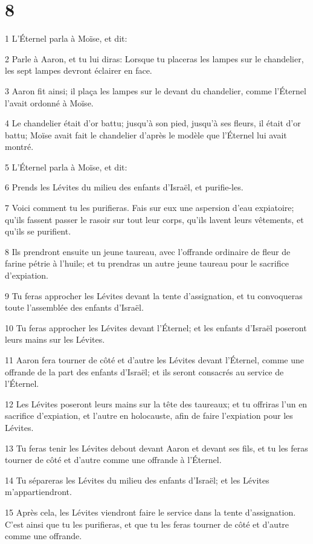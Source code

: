 \chapter{8}

\par 1 L'Éternel parla à Moïse, et dit:
\par 2 Parle à Aaron, et tu lui diras: Lorsque tu placeras les lampes sur le chandelier, les sept lampes devront éclairer en face.
\par 3 Aaron fit ainsi; il plaça les lampes sur le devant du chandelier, comme l'Éternel l'avait ordonné à Moïse.
\par 4 Le chandelier était d'or battu; jusqu'à son pied, jusqu'à ses fleurs, il était d'or battu; Moïse avait fait le chandelier d'après le modèle que l'Éternel lui avait montré.
\par 5 L'Éternel parla à Moïse, et dit:
\par 6 Prends les Lévites du milieu des enfants d'Israël, et purifie-les.
\par 7 Voici comment tu les purifieras. Fais sur eux une aspersion d'eau expiatoire; qu'ils fassent passer le rasoir sur tout leur corps, qu'ils lavent leurs vêtements, et qu'ils se purifient.
\par 8 Ils prendront ensuite un jeune taureau, avec l'offrande ordinaire de fleur de farine pétrie à l'huile; et tu prendras un autre jeune taureau pour le sacrifice d'expiation.
\par 9 Tu feras approcher les Lévites devant la tente d'assignation, et tu convoqueras toute l'assemblée des enfants d'Israël.
\par 10 Tu feras approcher les Lévites devant l'Éternel; et les enfants d'Israël poseront leurs mains sur les Lévites.
\par 11 Aaron fera tourner de côté et d'autre les Lévites devant l'Éternel, comme une offrande de la part des enfants d'Israël; et ils seront consacrés au service de l'Éternel.
\par 12 Les Lévites poseront leurs mains sur la tête des taureaux; et tu offriras l'un en sacrifice d'expiation, et l'autre en holocauste, afin de faire l'expiation pour les Lévites.
\par 13 Tu feras tenir les Lévites debout devant Aaron et devant ses fils, et tu les feras tourner de côté et d'autre comme une offrande à l'Éternel.
\par 14 Tu sépareras les Lévites du milieu des enfants d'Israël; et les Lévites m'appartiendront.
\par 15 Après cela, les Lévites viendront faire le service dans la tente d'assignation. C'est ainsi que tu les purifieras, et que tu les feras tourner de côté et d'autre comme une offrande.

